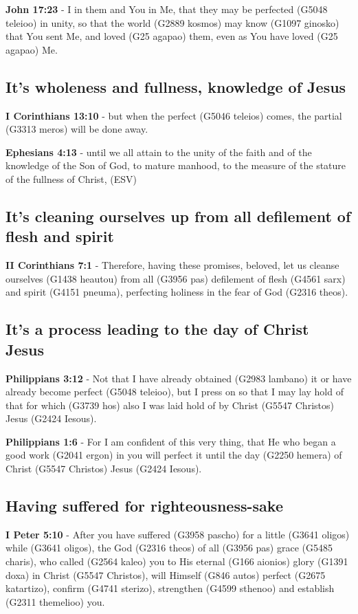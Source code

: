 \documentclass[11pt]{article}
\begin{document}
\textbf{John 17:23} - I in them and You in Me, that they may be perfected (G5048 teleioo) in unity, so that the world (G2889 kosmos) may know (G1097 ginosko) that You sent Me, and loved (G25 agapao) them, even as You have loved (G25 agapao) Me.

\subsection{It's wholeness and fullness, knowledge of Jesus}
\label{sec:orgf3f4204}
\textbf{I Corinthians 13:10} - but when the perfect (G5046 teleios) comes, the partial (G3313 meros) will be done away.

\textbf{Ephesians 4:13} -  until we all attain to the unity of the faith and of the knowledge of the Son of God, to mature manhood, to the measure of the stature of the fullness of Christ,  (ESV)

\subsection{It's cleaning ourselves up from all defilement of flesh and spirit}
\label{sec:org781ec01}
\textbf{II Corinthians 7:1} - Therefore, having these promises, beloved, let us cleanse ourselves (G1438 heautou) from all (G3956 pas) defilement of flesh (G4561 sarx) and spirit (G4151 pneuma), perfecting holiness in the fear of God (G2316 theos).

\subsection{It's a process leading to the day of Christ Jesus}
\label{sec:orgcba5369}
\textbf{Philippians 3:12} - Not that I have already obtained (G2983 lambano) it or have already become perfect (G5048 teleioo), but I press on so that I may lay hold of that for which (G3739 hos) also I was laid hold of by Christ (G5547 Christos) Jesus (G2424 Iesous).

\textbf{Philippians 1:6} - For I am confident of this very thing, that He who began a good work (G2041 ergon) in you will perfect it until the day (G2250 hemera) of Christ (G5547 Christos) Jesus (G2424 Iesous).

\subsection{Having suffered for righteousness-sake}
\label{sec:orgc9354aa}
\textbf{I Peter 5:10} - After you have suffered (G3958 pascho) for a little (G3641 oligos) while (G3641 oligos), the God (G2316 theos) of all (G3956 pas) grace (G5485 charis), who called (G2564 kaleo) you to His eternal (G166 aionios) glory (G1391 doxa) in Christ (G5547 Christos), will Himself (G846 autos) perfect (G2675 katartizo), confirm (G4741 sterizo), strengthen (G4599 sthenoo) and establish (G2311 themelioo) you.
\end{document}
